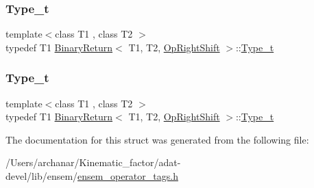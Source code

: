 \mbox{\label{structBinaryReturn_3_01T1_00_01T2_00_01OpRightShift_01_4_a669ff609f8117f57e60c22cb953ff2d6}} 
\subsubsection{\texorpdfstring{Type\_t}{Type\_t}\hspace{0.1cm}{\footnotesize\ttfamily [2/3]}}
{\footnotesize\ttfamily template$<$class T1 , class T2 $>$ \\
typedef T1 \mbox{\hyperlink{structBinaryReturn}{Binary\+Return}}$<$ T1, T2, \mbox{\hyperlink{structOpRightShift}{Op\+Right\+Shift}} $>$\+::\mbox{\hyperlink{structBinaryReturn_3_01T1_00_01T2_00_01OpRightShift_01_4_a669ff609f8117f57e60c22cb953ff2d6}{Type\+\_\+t}}}

\mbox{\label{structBinaryReturn_3_01T1_00_01T2_00_01OpRightShift_01_4_a669ff609f8117f57e60c22cb953ff2d6}} 
\subsubsection{\texorpdfstring{Type\_t}{Type\_t}\hspace{0.1cm}{\footnotesize\ttfamily [3/3]}}
{\footnotesize\ttfamily template$<$class T1 , class T2 $>$ \\
typedef T1 \mbox{\hyperlink{structBinaryReturn}{Binary\+Return}}$<$ T1, T2, \mbox{\hyperlink{structOpRightShift}{Op\+Right\+Shift}} $>$\+::\mbox{\hyperlink{structBinaryReturn_3_01T1_00_01T2_00_01OpRightShift_01_4_a669ff609f8117f57e60c22cb953ff2d6}{Type\+\_\+t}}}



The documentation for this struct was generated from the following file\+:\begin{DoxyCompactItemize}
\item 
/\+Users/archanar/\+Kinematic\+\_\+factor/adat-\/devel/lib/ensem/\mbox{\hyperlink{adat-devel_2lib_2ensem_2ensem__operator__tags_8h}{ensem\+\_\+operator\+\_\+tags.\+h}}\end{DoxyCompactItemize}
